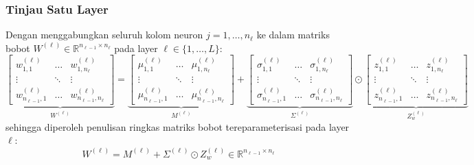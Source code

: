 \documentclass[11pt,a4paper]{article}
\theoremstyle{plain}
\theoremstyle{definition}
\theoremstyle{remark}
\begin{document}
\subsubsection{Tinjau Satu Layer}
\label{subsubsec:tinjau_satu_layer}

\noindent Dengan menggabungkan seluruh kolom neuron $j = 1, \dots, n_\ell$ ke dalam matriks bobot $W^{(\ell)} \in \mathbb{R}^{n_{\ell-1} \times n_\ell}$ pada layer $\ell \in \{1, \dots, L\}$:
\begin{equation}
    \underbrace{\begin{bmatrix}
        w^{(\ell)}_{1, 1} & \dots & w^{(\ell)}_{1, n_\ell} \\
        \vdots & \ddots & \vdots \\
        w^{(\ell)}_{n_{\ell-1}, 1} & \dots & w^{(\ell)}_{n_{\ell-1}, n_\ell}
    \end{bmatrix}}_{W^{(\ell)}}
    =
    \underbrace{\begin{bmatrix}
        \mu^{(\ell)}_{1, 1} & \dots & \mu^{(\ell)}_{1, n_\ell} \\
        \vdots & \ddots & \vdots \\
        \mu^{(\ell)}_{n_{\ell-1}, 1} & \dots & \mu^{(\ell)}_{n_{\ell-1}, n_\ell}
    \end{bmatrix}}_{M^{(\ell)}}
    +
    \underbrace{\begin{bmatrix}
        \sigma^{(\ell)}_{1, 1} & \dots & \sigma^{(\ell)}_{1, n_\ell} \\
        \vdots & \ddots & \vdots \\
        \sigma^{(\ell)}_{n_{\ell-1}, 1} & \dots & \sigma^{(\ell)}_{n_{\ell-1}, n_\ell}
    \end{bmatrix}}_{\Sigma^{(\ell)}}
    \odot
    \underbrace{\begin{bmatrix}
        z^{(\ell)}_{1, 1} & \dots & z^{(\ell)}_{1, n_\ell} \\
        \vdots & \ddots & \vdots \\
        z^{(\ell)}_{n_{\ell-1}, 1} & \dots & z^{(\ell)}_{n_{\ell-1}, n_\ell}
    \end{bmatrix}}_{Z_w^{(\ell)}} \label{eq:matrices_W_M_Sigma_Z}
\end{equation}
sehingga diperoleh penulisan ringkas matriks bobot tereparameterisasi pada layer $\ell$:
\begin{equation}
    W^{(\ell)} = M^{(\ell)} + \Sigma^{(\ell)} \odot Z_w^{(\ell)} \in \mathbb{R}^{n_{\ell-1} \times n_\ell} \label{eq:matrix_W_reparam}
\end{equation}
\end{document}
